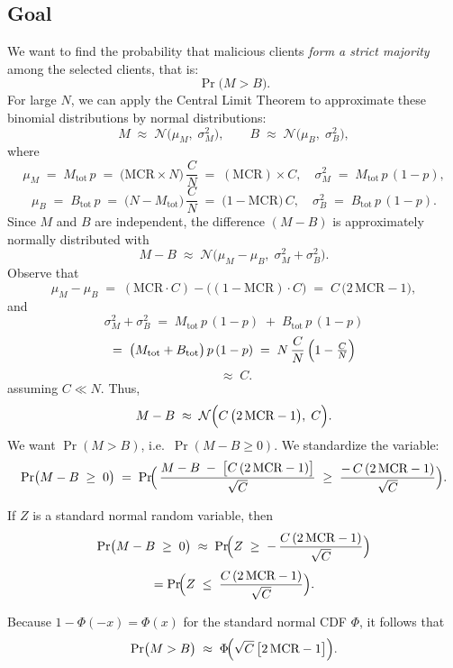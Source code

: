 \subsection*{Goal}
We want to find the probability that malicious clients \emph{form a strict majority} among the selected clients, that is:
\[
   \Pr\bigl(M > B\bigr).
\]
For large $N$, we can apply the Central Limit Theorem to approximate these binomial distributions by normal distributions:
\[
    M 
    \;\approx\; 
    \mathcal{N}\bigl(\mu_{M}, \;\sigma_{M}^2\bigr),
    \qquad
    B 
    \;\approx\;
    \mathcal{N}\bigl(\mu_{B}, \;\sigma_{B}^2\bigr),
\]
where
\[
    \mu_{M} 
    \;=\; 
    M_{\text{tot}}\,p 
    \;=\; 
    \bigl(\text{MCR}\times N\bigr) 
    \,\frac{C}{N}
    \;=\;
    (\text{MCR}) \times C,
    \quad
    \sigma_{M}^2 
    \;=\;
    M_{\text{tot}}\, p\,(1-p),
\]
\[
    \mu_{B} 
    \;=\;
    B_{\text{tot}}\,p
    \;=\;
    \bigl(N - M_{\text{tot}}\bigr)\,\frac{C}{N}
    \;=\;
    \bigl(1 - \text{MCR}\bigr)\,C,
    \quad
    \sigma_{B}^2 
    \;=\;
    B_{\text{tot}}\,p\,(1-p).
\]
Since $M$ and $B$ are independent, the difference $(M - B)$ is approximately normally distributed with
\[
    M - B 
    \;\approx\;
    \mathcal{N}\bigl(\mu_{M} - \mu_{B},\;
                     \sigma_{M}^2 + \sigma_{B}^2 \bigr).
\]
Observe that
\[
    \mu_{M} - \mu_{B}
    \;=\;
    (\text{MCR}\cdot C) - \bigl((1 - \text{MCR})\cdot C\bigr)
    \;=\;
    C\,\bigl(2\,\text{MCR} - 1\bigr),
\]
and
\[
  \sigma_{M}^2 + \sigma_{B}^2
  \;=\;
  M_{\text{tot}}\,p\,(1-p)
  \;+\;
  B_{\text{tot}}\,p\,(1-p)
\]
\[
  =\;
  \bigl(M_{\text{tot}} + B_{\text{tot}}\bigr)\,p\,(1-p)
  \;=\;
  N\,\frac{C}{N}\,\Bigl(1 - \tfrac{C}{N}\Bigr)
\]
\[
  \;\approx\;
  C.
\]
assuming $C \ll N$. Thus,
\[
    M - B
    \;\approx\;
    \mathcal{N}\Bigl( C\,\bigl(2\,\text{MCR} - 1\bigr), \; C \Bigr).
\]
We want $\Pr(M > B)$, i.e.\ $\Pr(M - B \ge 0)$. We standardize the variable:
\[
  \Pr\bigl(M - B \;\ge\; 0\bigr)
  \;=\;
  \Pr\!\Bigl(\,
    \frac{M - B \;-\; \bigl[C\,(2\,\text{MCR} - 1)\bigr]}{\sqrt{C}}
    \;\ge\;
    \frac{-\,C\,(2\,\text{MCR} - 1)}{\sqrt{C}}
  \Bigr).
\]

If $Z$ is a standard normal random variable, then
\[
  \Pr\bigl(M - B \;\ge\; 0\bigr)
  \;\approx\;
  \Pr\!\Bigl(
    Z \;\ge\; -\,\frac{C\,(2\,\text{MCR} - 1)}{\sqrt{C}}
  \Bigr)
\]
\[
  =
  \Pr\!\Bigl(
    Z \;\le\; \frac{C\,(2\,\text{MCR} - 1)}{\sqrt{C}}
  \Bigr).
\]


Because $1 - \Phi(-x) = \Phi(x)$ for the standard normal CDF $\Phi$, it follows that
\[
    \Pr\bigl(M > B\bigr)
    \;\approx\;
    \Phi\!\Bigl(\sqrt{C}\,\bigl[2\,\text{MCR} - 1\bigr]\Bigr).
\]

